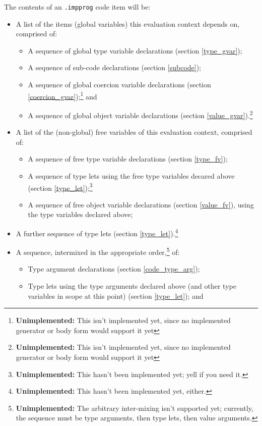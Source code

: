 \documentclass{report}
\newcommand\stringcode[1]{\texttt{#1}}
\newcommand\unimpl[1]{\footnote{\textbf{Unimplemented: }#1}}
\begin{document}
The contents of an \stringcode{.impprog} code item will be:
\begin{itemize}
    \item A list of the items (global variables) this evaluation context depends on, comprised of:
        \begin{itemize}
            \item A sequence of global type variable declarations (section \ref{type_gvar});
            \item A sequence of sub-code declarations (section \ref{subcode});
            \item A sequence of global coercion variable declarations (section \ref{coercion_gvar});\unimpl{This isn't implemented yet, since no implemented generator or body form would support it yet} and
            \item A sequence of global object variable declarations (section \ref{value_gvar}).\unimpl{This isn't implemented yet, since no implemented generator or body form would support it yet}
        \end{itemize}
    \item A list of the (non-global) free variables of this evaluation context, comprised of:
        \begin{itemize}
            \item A sequence of free type variable declarations (section \ref{type_fv});
            \item A sequence of type lets using the free type variables decared above (section \ref{type_let});\unimpl{This hasn't been implemented yet; yell if you need it.}
            \item A sequence of free object variable declarations (section \ref{value_fv}), using the type variables declared above;
        \end{itemize}
    \item A further sequence of type lets (section \ref{type_let}).\unimpl{This hasn't been implemented yet, either.}
    \item A sequence, intermixed in the appropriate order,\unimpl{The arbitrary inter-mixing isn't supported yet; currently, the sequence must be type arguments, then type lets, then value arguments.} of:
        \begin{itemize}
            \item Type argument declarations (section \ref{code_type_arg});
            \item Type lets using the type arguments declared above (and other type variables in scope at this point) (section \ref{type_let}); and

\end{itemize}
\end{itemize}
\end{document}
